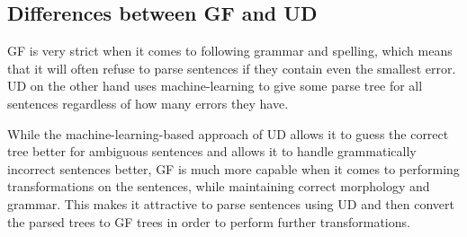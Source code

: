 \documentclass{article}
\begin{document}
\subsection{Differences between GF and UD}


GF is very strict when it comes to following grammar and spelling, which means that it will often refuse to parse sentences if they contain even the smallest error. UD on the other hand uses machine-learning to give some parse tree for all sentences regardless of how many errors they have.

While the machine-learning-based approach of UD allows it to guess the correct tree better for ambiguous sentences and allows it to handle grammatically incorrect sentences better, GF is much more capable when
it comes to performing transformations on the sentences, while maintaining correct morphology and grammar. This makes it attractive to parse sentences
using UD and then convert the parsed trees to GF trees in order to perform further transformations.










\end{document}
